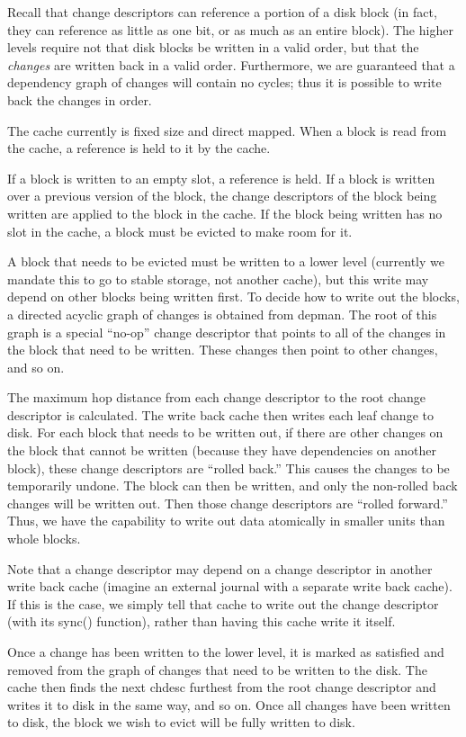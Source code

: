 Recall that change descriptors can reference a portion of a disk block (in fact,
they can reference as little as one bit, or as much as an entire block). The
higher levels require not that disk blocks be written in a valid order, but that
the \emph{changes} are written back in a valid order. Furthermore, we are
guaranteed that a dependency graph of changes will contain no cycles; thus it is
possible to write back the changes in order.

The cache currently is fixed size and direct mapped. When a block is read from
the cache, a reference is held to it by the cache.

If a block is written to an empty slot, a reference is held. If a block is
written over a previous version of the block, the change descriptors of the
block being written are applied to the block in the cache. If the block being
written has no slot in the cache, a block must be evicted to make room for it.

A block that needs to be evicted must be written to a lower level (currently we
mandate this to go to stable storage, not another cache), but this write may
depend on other blocks being written first. To decide how to write out the
blocks, a directed acyclic graph of changes is obtained from depman. The root of
this graph is a special ``no-op'' change descriptor that points to all of the
changes in the block that need to be written. These changes then point to other
changes, and so on.

The maximum hop distance from each change descriptor to the root change
descriptor is calculated. The write back cache then writes each leaf change to
disk. For each block that needs to be written out, if there are other changes on
the block that cannot be written (because they have dependencies on another
block), these change descriptors are ``rolled back.'' This causes the changes to
be temporarily undone. The block can then be written, and only the non-rolled
back changes will be written out. Then those change descriptors are ``rolled
forward.'' Thus, we have the capability to write out data atomically in smaller
units than whole blocks.

Note that a change descriptor may depend on a change descriptor in another write
back cache (imagine an external journal with a separate write back cache). If
this is the case, we simply tell that cache to write out the change descriptor
(with its sync() function), rather than having this cache write it itself.

Once a change has been written to the lower level, it is marked as satisfied and
removed from the graph of changes that need to be written to the disk. The cache
then finds the next chdesc furthest from the root change descriptor and writes
it to disk in the same way, and so on. Once all changes have been written to
disk, the block we wish to evict will be fully written to disk.

